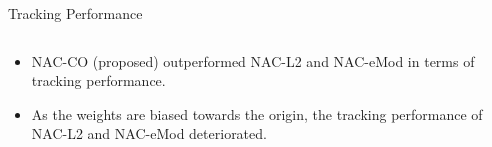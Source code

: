 \documentclass[8pt, aspectratio=169]{beamer}
\begin{document}
\begin{frame}{\insertsubsectionhead}{Tracking Performance}
\begin{columns}
  \end{columns}

  \begin{itemize}
    \item NAC-CO (proposed) outperformed NAC-L2 and NAC-eMod in terms of tracking performance.
    \item As the weights are biased towards the origin, the tracking performance of NAC-L2 and NAC-eMod deteriorated.
  \end{itemize}

\end{frame}






      
\end{document}
